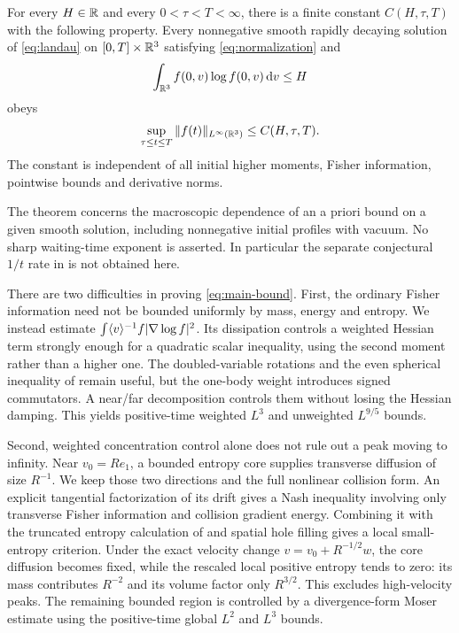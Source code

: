 \begin{theorem}\label{thm:main}
For every $H\in\mathbb R$ and every $0<\tau<T<\infty$, there is a finite constant $C(H,\tau,T)$ with the following property. Every nonnegative smooth rapidly decaying solution of \eqref{eq:landau} on $[0,T]\times\mathbb R^3$ satisfying \eqref{eq:normalization} and
\[
 \int_{\mathbb R^3}f(0,v)\log f(0,v)\,\mathrm dv\le H
\]
obeys
\begin{equation}\label{eq:main-bound}
 \sup_{\tau\le t\le T}\|f(t)\|_{L^\infty(\mathbb R^3)}\le C(H,\tau,T).
\end{equation}
The constant is independent of all initial higher moments, Fisher information, pointwise bounds and derivative norms.
\end{theorem}

The theorem concerns the macroscopic dependence of an a priori bound on a given smooth solution, including nonnegative initial profiles with vacuum. No sharp waiting-time exponent is asserted. In particular the separate conjectural $1/t$ rate in \cite{GGL} is not obtained here.

There are two difficulties in proving \eqref{eq:main-bound}. First, the ordinary Fisher information need not be bounded uniformly by mass, energy and entropy. We instead estimate
$\int\langle v\rangle^{-1}f|\nabla\log f|^2$. Its dissipation controls a weighted Hessian term strongly enough for a quadratic scalar inequality, using the second moment rather than a higher one. The doubled-variable rotations and the even spherical inequality of \cite{GS} remain useful, but the one-body weight introduces signed commutators. A near/far decomposition controls them without losing the Hessian damping. This yields positive-time weighted $L^3$ and unweighted $L^{9/5}$ bounds.

Second, weighted concentration control alone does not rule out a peak moving to infinity. Near $v_0=Re_1$, a bounded entropy core supplies transverse diffusion of size $R^{-1}$. We keep those two directions and the full nonlinear collision form. An explicit tangential factorization of its drift gives a Nash inequality involving only transverse Fisher information and collision gradient energy. Combining it with the truncated entropy calculation of \cite{GIJV} and spatial hole filling gives a local small-entropy criterion. Under the exact velocity change $v=v_0+R^{-1/2}w$, the core diffusion becomes fixed, while the rescaled local positive entropy tends to zero: its mass contributes $R^{-2}$ and its volume factor only $R^{3/2}$. This excludes high-velocity peaks. The remaining bounded region is controlled by a divergence-form Moser estimate using the positive-time global $L^2$ and $L^3$ bounds.


